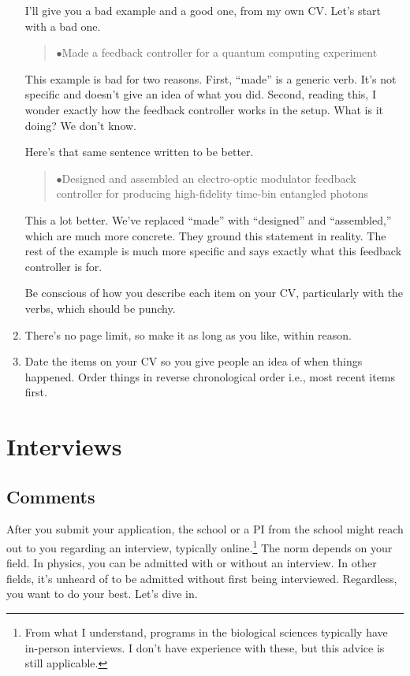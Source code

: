 \documentclass[12pt]{article}
\begin{document}
\begin{enumerate}
I'll give you a bad example and a good one, from my own CV. Let's start with a bad one.
\begin{quote}
$\bullet$\quad Made a feedback controller for a quantum computing experiment
\end{quote}

This example is bad for two reasons. First, ``made'' is a generic verb. It's not specific and doesn't give an idea of what you did. Second, reading this, I wonder exactly how the feedback controller works in the setup. What is it doing? We don't know.

Here's that same sentence written to be better.

\begin{quote}
$\bullet$\quad  Designed and assembled an electro-optic modulator feedback controller for producing high-fidelity time-bin entangled photons
\end{quote}

This a lot better. We've replaced ``made'' with ``designed'' and ``assembled,'' which are much more concrete. They ground this statement in reality. The rest of the example is much more specific and says exactly what this feedback controller is for.

Be conscious of how you describe each item on your CV, particularly with the verbs, which should be punchy.

\item There's no page limit, so make it as long as you like, within reason.

\item Date the items on your CV so you give people an idea of when things happened. Order things in reverse chronological order i.e., most recent items first.
\end{enumerate} 


\section{Interviews}
\subsection{Comments}
After you submit your application, the school or a PI from the school might reach out to you regarding an interview, typically online.\footnote{From what I understand, programs in the biological sciences typically have in-person interviews. I don't have experience with these, but this advice is still applicable.} The norm depends on your field. In physics, you can be admitted with or without an interview. In other fields, it's unheard of to be admitted without first being interviewed. Regardless, you want to do your best. Let's dive in.
\end{document}
